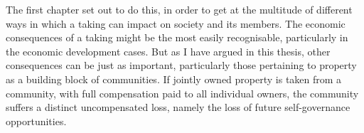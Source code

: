 {{%






The first chapter set out to do this, in order to get at the multitude of different ways in which a taking can impact on society and its members. The economic consequences of a taking might be the most easily recognisable, particularly in the economic development cases. But as I have argued in this thesis, other consequences can be just as important, particularly those pertaining to property as a building block of communities. If jointly owned property is taken from a community, with full compensation paid to all individual owners, the community suffers a distinct uncompensated loss, namely the loss of future self-governance opportunities. %

}}
